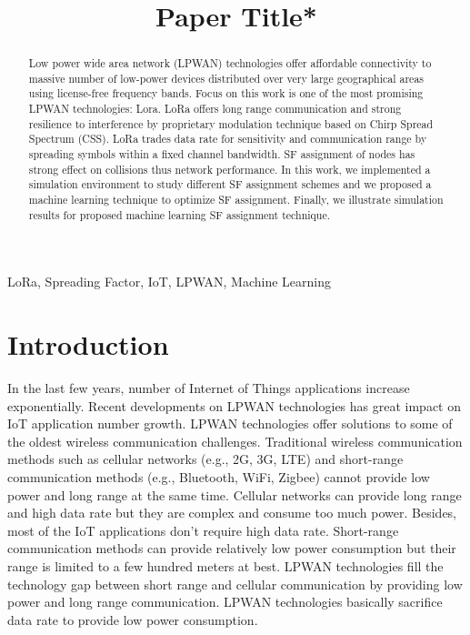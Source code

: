\documentclass[conference]{IEEEtran}
\begin{document}
\title{Paper Title*
}


\author{
}
\maketitle


\begin{abstract}
Low power wide area network (LPWAN) technologies offer affordable connectivity to massive number of low-power devices distributed over very large geographical areas using license-free frequency bands. Focus on this work is one of the most promising LPWAN technologies: Lora. LoRa offers long range communication and strong resilience to interference by proprietary modulation technique based on Chirp Spread Spectrum (CSS). LoRa trades data rate for sensitivity and communication range by spreading symbols within a fixed channel bandwidth. SF assignment of nodes has strong effect on collisions thus network performance. In this work, we implemented a simulation environment to study different SF assignment schemes and we proposed a machine learning technique to optimize SF assignment. Finally, we illustrate simulation results for proposed machine learning SF assignment technique.
\end{abstract}


\begin{IEEEkeywords}
LoRa, Spreading Factor, IoT, LPWAN, Machine Learning
\end{IEEEkeywords}


\section{Introduction}
\par In the last few years, number of Internet of Things applications increase exponentially. \cite{7721743} Recent developments on LPWAN technologies has great impact on IoT application number growth. LPWAN technologies offer solutions to some of the oldest wireless communication challenges. Traditional wireless communication methods such as cellular networks (e.g., 2G, 3G, LTE) and short-range communication methods (e.g., Bluetooth, WiFi, Zigbee) cannot provide low power and long range at the same time. Cellular networks can provide long range and high data rate but they are complex and consume too much power. Besides, most of the IoT applications don't require high data rate. Short-range communication methods can provide relatively low power consumption but their range is limited to a few hundred meters at best. \cite{7815384} LPWAN technologies fill the technology gap between short range and cellular communication by providing low power and long range communication. LPWAN technologies basically sacrifice data rate to provide low power consumption.
\end{document}
